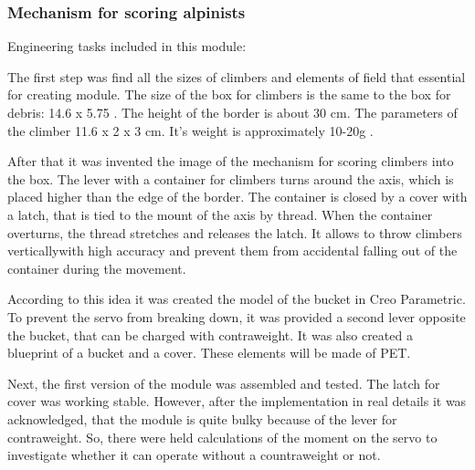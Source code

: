 \subsubsection{Mechanism for scoring alpinists}
  
  Engineering tasks included in this module:
  \begin{enumerate*}
    \item The first step was find all the sizes of climbers and elements of field that essential for creating module. The size of the box for climbers is the same to the box for debris: 14.6 x 5.75 . The height of the border is about 30 cm. The parameters of the climber 11.6 x 2 x 3 cm. It's weight is approximately 10-20g .
    
    \item After that it was invented the image of the mechanism for scoring climbers into the box. The lever with a container for climbers turns around the axis, which is placed higher than the edge of the border. The container is closed by a cover with a latch, that is tied to the mount of the axis by thread. When the container overturns, the thread stretches and releases the latch. It allows to throw climbers verticallywith high accuracy and prevent them from accidental falling out of the container during the movement.
    
    \item According to this idea it was created the model of the bucket in Creo Parametric. To prevent the servo from breaking down, it was provided a second lever opposite the bucket, that can be charged with contraweight. It was also created a blueprint of a bucket and a cover. These elements will be made of PET.
    
    \item Next, the first version of the module was assembled and tested. The latch for cover was working stable. However, after the implementation in real details it was acknowledged, that the module is quite bulky because of the lever for contraweight. So, there were held calculations of the moment on the servo to investigate whether it can operate without a countraweight or not.
  
  \end{enumerate*}	
  
  
  